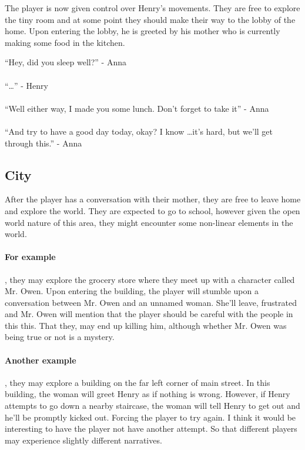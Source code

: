 \documentclass[12pt, a4paper, titlepage]{article}
\begin{document}
            The player is now given control over Henry's movements. They are free to explore the tiny room and at some point
            they should make their way to the lobby of the home. Upon entering the lobby, he is greeted by his mother who is
            currently making some food in the kitchen.

            ``Hey, did you sleep well?'' - Anna\\~\\
            ``\ldots'' - Henry\\~\\
            ``Well either way, I made you some lunch. Don't forget to take it'' - Anna\\~\\
            ``And try to have a good day today, okay? I know \ldots it's hard, but we'll get through this.'' - Anna

        \subsection{City}

            After the player has a conversation with their mother, they are free to leave home and explore the world. They are
            expected to go to school, however given the open world nature of this area, they might encounter some non-linear elements in the
            world.
            
            \paragraph{For example}, they may explore the grocery store where they meet up with a character called Mr. Owen. Upon entering the building, the player
            will stumble upon a conversation between Mr. Owen and an unnamed woman. She'll leave, frustrated and Mr. Owen will mention that the player
            should be careful with the people in this this. That they, may end up killing him, although whether Mr. Owen was being true or not is a mystery.
            
            \paragraph{Another example}, they may explore a building on the far left corner of main street. In this building, the woman will greet Henry as if
            nothing is wrong. However, if Henry attempts to go down a nearby staircase, the woman will tell Henry to get out and he'll be promptly kicked out. Forcing
            the player to try again. I think it would be interesting to have the player not have another attempt. So that different players may experience slightly different
            narratives.
            
\end{document}
